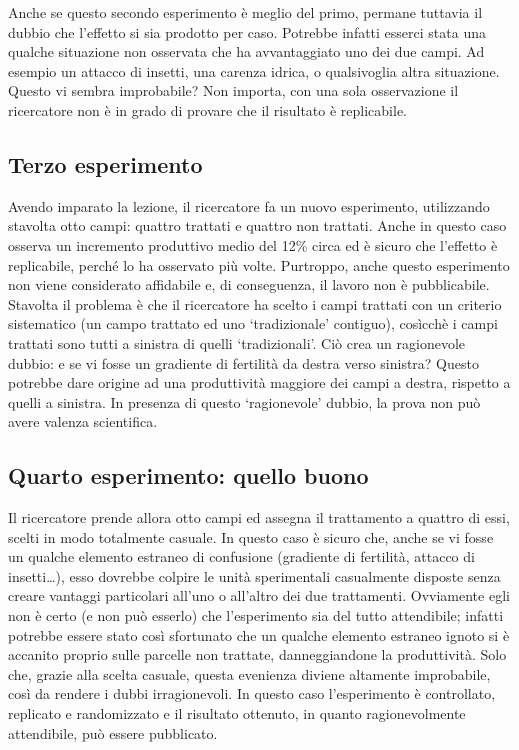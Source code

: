 \documentclass[a4paper,12pt,oneside]{book}
\begin{document}
Anche se questo secondo esperimento è meglio del primo, permane tuttavia
il dubbio che l'effetto si sia prodotto per caso. Potrebbe infatti
esserci stata una qualche situazione non osservata che ha avvantaggiato
uno dei due campi. Ad esempio un attacco di insetti, una carenza idrica,
o qualsivoglia altra situazione. Questo vi sembra improbabile? Non
importa, con una sola osservazione il ricercatore non è in grado di
provare che il risultato è replicabile.

\subsection{Terzo esperimento}\label{terzo-esperimento}

Avendo imparato la lezione, il ricercatore fa un nuovo esperimento,
utilizzando stavolta otto campi: quattro trattati e quattro non
trattati. Anche in questo caso osserva un incremento produttivo medio
del 12\% circa ed è sicuro che l'effetto è replicabile, perché lo ha
osservato più volte. Purtroppo, anche questo esperimento non viene
considerato affidabile e, di conseguenza, il lavoro non è pubblicabile.
Stavolta il problema è che il ricercatore ha scelto i campi trattati con
un criterio sistematico (un campo trattato ed uno `tradizionale'
contiguo), cosìcchè i campi trattati sono tutti a sinistra di quelli
`tradizionali'. Ciò crea un ragionevole dubbio: e se vi fosse un
gradiente di fertilità da destra verso sinistra? Questo potrebbe dare
origine ad una produttività maggiore dei campi a destra, rispetto a
quelli a sinistra. In presenza di questo `ragionevole' dubbio, la prova
non può avere valenza scientifica.

\subsection{Quarto esperimento: quello
buono}\label{quarto-esperimento-quello-buono}

Il ricercatore prende allora otto campi ed assegna il trattamento a
quattro di essi, scelti in modo totalmente casuale. In questo caso è
sicuro che, anche se vi fosse un qualche elemento estraneo di confusione
(gradiente di fertilità, attacco di insetti\ldots{}), esso dovrebbe
colpire le unità sperimentali casualmente disposte senza creare vantaggi
particolari all'uno o all'altro dei due trattamenti. Ovviamente egli non
è certo (e non può esserlo) che l'esperimento sia del tutto attendibile;
infatti potrebbe essere stato così sfortunato che un qualche elemento
estraneo ignoto si è accanito proprio sulle parcelle non trattate,
danneggiandone la produttività. Solo che, grazie alla scelta casuale,
questa evenienza diviene altamente improbabile, così da rendere i dubbi
irragionevoli. In questo caso l'esperimento è controllato, replicato e
randomizzato e il risultato ottenuto, in quanto ragionevolmente
attendibile, può essere pubblicato.
\end{document}

